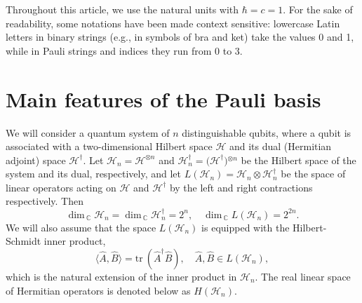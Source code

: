 \documentclass[12pt,a4paper,twoside]{article}      %
\begin{document}
Throughout this article, we use the natural units with $\hbar=c=1$. For the sake of readability, some notations have been made context sensitive: lowercase Latin letters in binary strings (e.g., in symbols of bra and ket) take the values 0 and 1, while in Pauli strings and indices they run from 0 to 3.






\section{Main features of the Pauli basis}
\label{sec2}

We will consider a quantum system of $n$ distinguishable qubits, where a qubit is associated with a two-dimensional Hilbert space $\mathcal{H}$ and its dual (Hermitian adjoint) space $\mathcal{H}^\dag$. Let $\mathcal{H}_n= \mathcal{H}^{\otimes n}$ and $\mathcal{H}_n^\dag= \big(\mathcal{H}^\dag\big){}^{\otimes n}$ be the Hilbert space of the system and its dual, respectively, and let $L(\mathcal{H}_n)=\mathcal{H}_n\otimes\mathcal{H}_n^\dag$ be the space of linear operators acting on $\mathcal{H}$ and $\mathcal{H}^\dag$ by the left and right contractions respectively. Then
\begin{equation}\label{}
\dim_{\:\!\mathbb{C}}\!\mathcal{H}_n= \dim_{\:\!\mathbb{C}}\!\mathcal{H}^\dag_n= 2^n, \quad \dim_{\:\!\mathbb{C}}\!L(\mathcal{H}_n)= 2^{2n}.
\nonumber
\end{equation}
We will also assume that the space $L(\mathcal{H}_n)$ is equipped with the Hilbert-Schmidt inner product,
\begin{equation}\label{inner}
\langle\hat{A},\hat{B}\rangle= \mathrm{tr}\:\!(\hat{A}^\dag\hat{B}),\quad \hat{A}, \hat{B}\in L(\mathcal{H}_n),
\end{equation}
which is the natural extension of the inner product in $\mathcal{H}_n$. The real linear space of Hermitian operators is denoted below as $H(\mathcal{H}_n)$.
\end{document}

